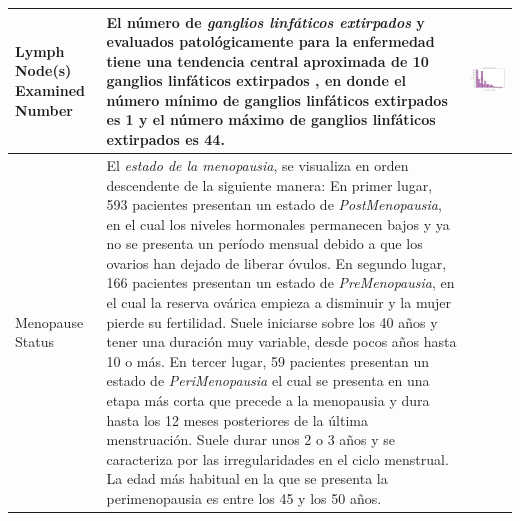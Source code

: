 \begin{table}[!htb]
	\footnotesize
	\begin{threeparttable}
		\begin{tabular}{p{2.5cm} p{7cm} p{6.5cm}} \toprule			
			Lymph Node(s) Examined Number
			& El número de \textit{ganglios linfáticos extirpados} y evaluados patológicamente para la enfermedad tiene una tendencia central aproximada de 10 ganglios linfáticos extirpados , en donde el número mínimo de ganglios linfáticos extirpados es 1 y el número máximo de ganglios linfáticos extirpados es 44.
			& 
			\begin{center}\includegraphics[width=1\linewidth]{NOTEBOOK/IMAGENES_DESCRIPTIVAS/24_lymph_examined_number}\end{center}
			\\ \hline
			Menopause Status
			& El \textit{estado de la menopausia}, se visualiza en orden descendente de la siguiente manera: En primer lugar, 593 pacientes presentan un estado de \textit{PostMenopausia}, en el cual los niveles hormonales permanecen bajos y ya no se presenta un período mensual debido a que los ovarios han dejado de liberar óvulos. En segundo lugar, 166 pacientes presentan un estado de \textit{PreMenopausia}, en el cual la reserva ovárica empieza a disminuir y la mujer pierde su fertilidad. Suele iniciarse sobre los 40 años y tener una duración muy variable, desde pocos años hasta 10 o más. En tercer lugar, 59 pacientes presentan un estado de \textit{PeriMenopausia} el cual se presenta en una etapa más corta que precede a la menopausia y dura hasta los 12 meses posteriores de la última menstruación. Suele durar unos 2 o 3 años y se caracteriza por las irregularidades en el ciclo menstrual. La edad más habitual en la que se presenta la perimenopausia es entre los 45 y los 50 años\cite{ReproAsistidaORG}.
			

\end{tabular}
\end{threeparttable}
\end{table}
